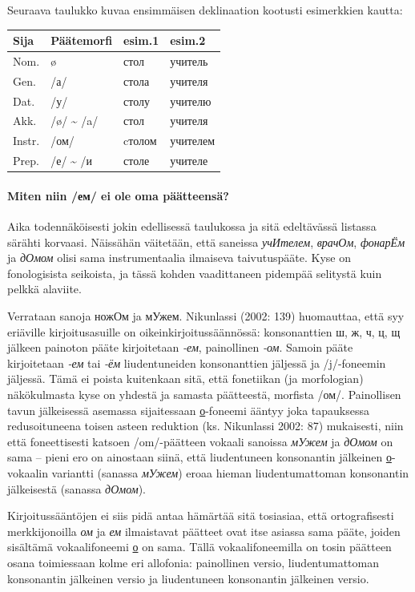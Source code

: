 \documentclass[]{scrartcl}
\begin{document}
Seuraava taulukko kuvaa ensimmäisen deklinaation kootusti esimerkkien
kautta:

\begin{longtable}[c]{@{}llll@{}}
\toprule
Sija & Päätemorfi & esim.1 & esim.2\tabularnewline
\midrule
\endhead
Nom. & ø & стол & учитель\tabularnewline
Gen. & /а/ & стола & учителя\tabularnewline
Dat. & /у/ & столу & учителю\tabularnewline
Akk. & /ø/ \textasciitilde{} /a/ & стол & учителя\tabularnewline
Instr. & /ом/ & cтолом & учителем\tabularnewline
Prep. & /е/ \textasciitilde{} /и & столе & учителе\tabularnewline
\bottomrule
\end{longtable}

\paragraph{Miten niin /ем/ ei ole oma
päätteensä?}\label{miten-niin-ux435ux43c-ei-ole-oma-puxe4uxe4tteensuxe4}

Aika todennäköisesti jokin edellisessä taulukossa ja sitä edeltävässä
listassa särähti korvaasi. Näissähän väitetään, että saneissa
\emph{учИтелем}, \emph{врачОм}, \emph{фонарЁм} ja \emph{дОмом} olisi
sama instrumentaalia ilmaiseva taivutuspääte. Kyse on fonologisista
seikoista, ja tässä kohden vaadittaneen pidempää selitystä kuin pelkkä
alaviite.

Verrataan sanoja ножОм ja мУжем. Nikunlassi (2002: 139) huomauttaa, että
syy eriäville kirjoitusasuille on oikeinkirjoitussäännössä:
konsonanttien ш, ж, ч, ц, щ jälkeen painoton pääte kirjoitetaan
\emph{-ем}, painollinen \emph{-ом}. Samoin pääte kirjoitetaan \emph{-ем}
tai \emph{-ём} liudentuneiden konsonanttien jäljessä ja /j/-foneemin
jäljessä. Tämä ei poista kuitenkaan sitä, että fonetiikan (ja
morfologian) näkökulmasta kyse on yhdestä ja samasta päätteestä,
morfista /ом/. Painollisen tavun jälkeisessä asemassa sijaitessaan
\hyperref[ux43e]{о}-foneemi ääntyy joka tapauksessa redusoituneena
toisen asteen reduktion (ks. Nikunlassi 2002: 87) mukaisesti, niin että
foneettisesti katsoen /om/-päätteen vokaali sanoissa \emph{мУжем} ja
\emph{дОмом} on sama -- pieni ero on ainostaan siinä, että liudentuneen
konsonantin jälkeinen \hyperref[ux43e]{о}-vokaalin variantti (sanassa
\emph{мУжем}) eroaa hieman liudentumattoman konsonantin jälkeisestä
(sanassa \emph{дОмом}).

Kirjoitussääntöjen ei siis pidä antaa hämärtää sitä tosiasiaa, että
ortografisesti merkkijonoilla \emph{ом} ja \emph{ем} ilmaistavat
päätteet ovat itse asiassa sama pääte, joiden sisältämä vokaalifoneemi
\hyperref[ux43e]{о} on sama. Tällä vokaalifoneemilla on tosin päätteen
osana toimiessaan kolme eri allofonia: painollinen versio,
liudentumattoman konsonantin jälkeinen versio ja liudentuneen
konsonantin jälkeinen versio.
\end{document}
